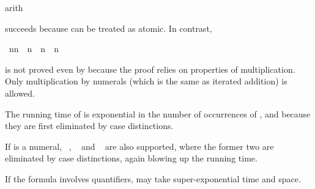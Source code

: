 \begin{isabellebody}
%
\isadelimproof
%
\endisadelimproof
%
\isatagproof
{}\isamarkupfalse%
{\isacharparenleft}arith{\isacharparenright}\isamarkupfalse%
%
\endisatagproof
{\isafoldproof}%
%
\isadelimproof
%
\endisadelimproof
%
\begin{isamarkuptext}%
\noindent
succeeds because  can be treated as atomic. In contrast,%
\end{isamarkuptext}%
\isamarkuptrue%
\isamarkupfalse%
\ {\isachardoublequoteopen}n{\isacharasterisk}n\ {\isacharequal}\ n\ {\isasymLongrightarrow}\ n{\isacharequal}{}\ {\isasymor}\ n{\isacharequal}{}{\isachardoublequoteclose}%
\isadelimproof
%
\endisadelimproof
%
\isatagproof
\isamarkupfalse%
%
\endisatagproof
{\isafoldproof}%
%
\isadelimproof
%
\endisadelimproof
%
\begin{isamarkuptext}%
\noindent
is not proved even by  because the proof relies 
on properties of multiplication. Only multiplication by numerals (which is
the same as iterated addition) is allowed.

\begin{warn} The running time of  is exponential in the number
  of occurrences of ,  and
   because they are first eliminated by case distinctions.

If  is a numeral, ~, ~ and
~ are also supported, where the former two are eliminated
by case distinctions, again blowing up the running time.

If the formula involves quantifiers,  may take
super-exponential time and space.
\end{warn}%
\end{isamarkuptext}%
\isamarkuptrue%
%
\isadelimtheory
%
\endisadelimtheory
%
\isatagtheory
\isamarkupfalse%
%
\endisatagtheory
{\isafoldtheory}%
%
\isadelimtheory
%
\endisadelimtheory
\end{isabellebody}%

